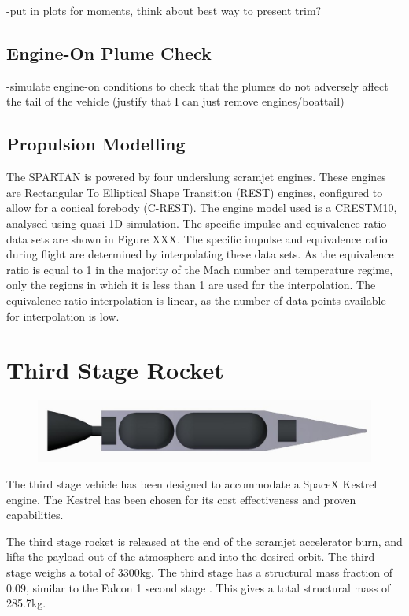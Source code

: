 -put in plots for moments, think about best way to present trim?

\subsection{Engine-On Plume Check}
-simulate engine-on conditions to check that the plumes do not adversely affect the tail of the vehicle (justify that I can just remove engines/boattail)
		
		\subsection{Propulsion Modelling}
		
		The SPARTAN is powered by four underslung scramjet engines. These engines are Rectangular To Elliptical Shape Transition (REST) engines, configured to allow for a conical forebody (C-REST). The engine model used is a CRESTM10, analysed using quasi-1D simulation. The specific impulse and equivalence ratio data sets are shown in Figure XXX. The specific impulse and equivalence ratio during flight are determined by interpolating these data sets. 
		As the equivalence ratio is equal to 1 in the majority of the Mach number and temperature regime, only the regions in which it is less than 1 are used for the interpolation. The equivalence ratio interpolation is linear, as the number of data points available for interpolation is low. 
	
	
	\section{Third Stage Rocket}
	
	\begin{figure}
\centering
\includegraphics[width=0.7\linewidth]{figures/3_vehicle_design/3rdStage}
\caption{}
\label{fig:3rdStage}
\end{figure}

	The third stage vehicle has been designed to accommodate a SpaceX Kestrel engine. The Kestrel has been chosen for its cost effectiveness and proven capabilities. 
	
	The third stage rocket is released at the end of the scramjet accelerator burn, and lifts the payload out of the atmosphere and into the desired orbit. The third stage weighs a total of 3300kg. The third stage has a structural mass fraction of 0.09, similar to the Falcon 1 second stage \cite{Vehicle2008}. This gives a total structural mass of 285.7kg. 
	
